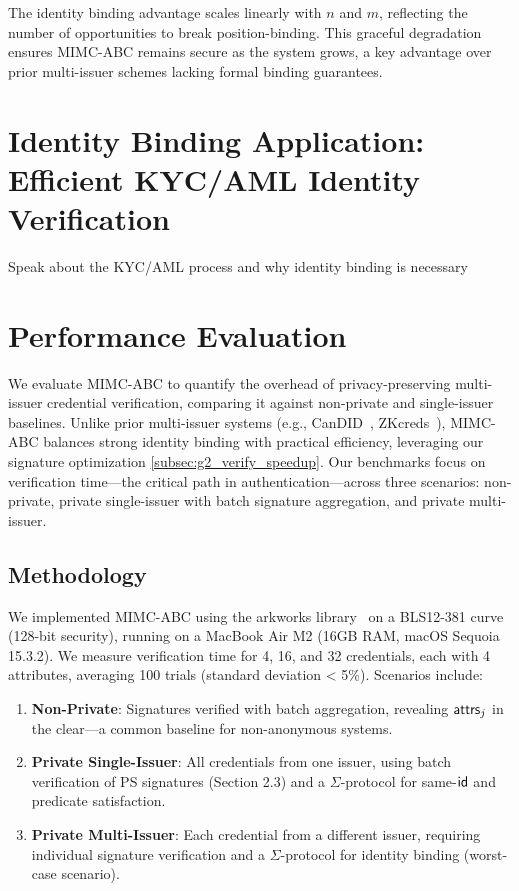The identity binding advantage scales linearly with $n$ and $m$, reflecting the number of opportunities to break position-binding. This graceful degradation ensures MIMC-ABC remains secure as the system grows, a key advantage over prior multi-issuer schemes lacking formal binding guarantees.

\section{Identity Binding Application: Efficient KYC/AML Identity Verification}

Speak about the KYC/AML process and why identity binding is necessary


\section{Performance Evaluation}

We evaluate MIMC-ABC to quantify the overhead of privacy-preserving multi-issuer credential verification, comparing it against non-private and single-issuer baselines. Unlike prior multi-issuer systems (e.g., CanDID~\cite{maram_candid_2020}, ZKcreds~\cite{rosenberg_zk-creds_2022}), MIMC-ABC balances strong identity binding with practical efficiency, leveraging our signature optimization \ref{subsec:g2_verify_speedup}. Our benchmarks focus on verification time—the critical path in authentication—across three scenarios: non-private, private single-issuer with batch signature aggregation, and private multi-issuer.

\subsection{Methodology}

We implemented MIMC-ABC using the arkworks library~\cite{arkworks_contributors_arkworks_2022} on a BLS12-381 curve (128-bit security), running on a MacBook Air M2 (16GB RAM, macOS Sequoia 15.3.2). We measure verification time for 4, 16, and 32 credentials, each with 4 attributes, averaging 100 trials (standard deviation < 5\%). Scenarios include:
\begin{enumerate}
    \item \textbf{Non-Private}: Signatures verified with batch aggregation, revealing $\mathsf{attrs}_j$ in the clear—a common baseline for non-anonymous systems.
    \item \textbf{Private Single-Issuer}: All credentials from one issuer, using batch verification of PS signatures (Section 2.3) and a $\Sigma$-protocol for same-$\mathsf{id}$ and predicate satisfaction.
    \item \textbf{Private Multi-Issuer}: Each credential from a different issuer, requiring individual signature verification and a $\Sigma$-protocol for identity binding (worst-case scenario).
\end{enumerate}




